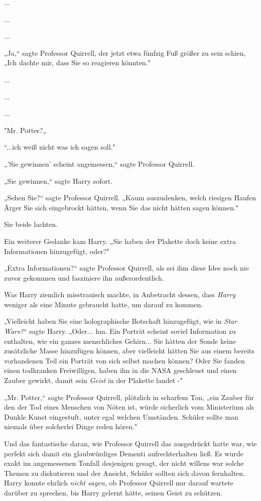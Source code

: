 {...

...

...

„Ja,“ sagte Professor Quirrell, der jetzt etwa fünfzig Fuß größer zu sein schien, „Ich dachte mir, dass Sie so reagieren könnten."

...

...

...

"Mr. Potter?„

“...ich weiß nicht was ich sagen soll."

„'Sie gewinnen' scheint angemessen,“ sagte Professor Quirrell.

„Sie gewinnen,“ sagte Harry sofort.

„Sehen Sie?“ sagte Professor Quirrell. „Kaum auszudenken, welch riesigen Haufen Ärger Sie sich eingebrockt hätten, wenn Sie das nicht hätten sagen können."

Sie beide lachten.

Ein weiterer Gedanke kam Harry. „Sie haben der Plakette doch keine extra Informationen hinzugefügt, oder?"

„Extra Informationen?“ sagte Professor Quirrell, als sei ihm diese Idee noch nie zuvor gekommen und fasziniere ihn außerordentlich.

Was Harry ziemlich misstrauisch machte, in Anbetracht dessen, dass \emph{Harry} weniger als eine Minute gebraucht hatte, um darauf zu kommen.

„Vielleicht haben Sie eine holographische Botschaft hinzugefügt, wie in \emph{Star Wars?}“ sagte Harry. „Oder... hm. Ein Porträt scheint soviel Information zu enthalten, wie ein ganzes menschliches Gehirn... Sie hätten der Sonde keine zusätzliche Masse hinzufügen können, aber vielleicht hätten Sie aus einem bereits vorhandenen Teil ein Porträt von sich selbst machen können? Oder Sie fanden einen todkranken Freiwilligen, haben ihn in die NASA geschleust und einen Zauber gewirkt, damit sein \emph{Geist} in der Plakette landet -"

„Mr. Potter,“ sagte Professor Quirrell, plötzlich in scharfem Ton, „ein Zauber für den der Tod eines Menschen von Nöten ist, würde sicherlich vom Ministerium als Dunkle Kunst eingestuft, unter egal welchen Umständen. Schüler sollte man niemals über solcherlei Dinge reden hören."

Und das fantastische daran, wie Professor Quirrell das ausgedrückt hatte war, wie perfekt sich damit ein glaubwürdiges Dementi aufrechterhalten ließ. Es wurde exakt im angemessenen Tonfall desjenigen gesagt, der nicht willens war solche Themen zu diskutieren und der Ansicht, Schüler sollten sich davon fernhalten. Harry konnte ehrlich \emph{nicht sagen,} ob Professor Quirrell nur darauf wartete darüber zu sprechen, bis Harry gelernt hätte, seinen Geist zu schützen.

}
